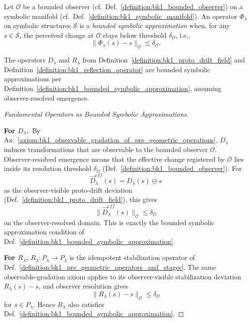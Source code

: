 \begin{definition}
\label{definition:bk1_bounded_symbolic_approximation}
\leavevmode\newline
Let $\mathcal{O}$ be a bounded observer
(cf.~Def.~\ref{definition:bk1_bounded_observer}) on a symbolic manifold
(cf.~Def.~\ref{definition:bk1_symbolic_manifold}).
An operator $\Phi_\lambda$ on symbolic structures $\mathcal{S}$ is a
\emph{bounded symbolic approximation} when, for any $s \in \mathcal{S}$, the
perceived change at $\mathcal{O}$ stays below threshold $\delta_\mathcal{O}$,
i.e.,
\[
\|\Phi_\lambda(s) - s\|_\mathcal{O} \leq \delta_\mathcal{O}.
\]
\end{definition}

\begin{proposition}
\label{proposition:bk1_the_operators_lambda_and_lambda}
The operators $D_\lambda$ and $R_\lambda$ from Definition~\ref{definition:bk1_proto_drift_field} and Definition~\ref{definition:bk1_reflection_operator} are bounded symbolic approximations per Definition~\ref{definition:bk1_bounded_symbolic_approximation}, assuming observer-resolved emergence.
\end{proposition}
\begin{proof}[Fundamental Operators as Bounded Symbolic Approximations]
\label{proof:bk1_sketch_effective_proto_drift_field_induction}
\leavevmode

\textbf{For $D_\lambda$.}\ By Ax.~\ref{axiom:bk1_observable_gradation_of_pre_geometric_operations},
\(D_\lambda\) induces transformations that are observable to the bounded
observer \(\mathcal{O}\). Observer-resolved emergence means that the effective
change registered by \(\mathcal{O}\) lies inside its resolution threshold
\(\delta_{\mathcal{O}}\) (Def.~\ref{definition:bk1_bounded_observer}). For
\[
\vec{D}_\lambda^{eff}(s)=D_\lambda(s)\ominus s
\]
as the observer-visible proto-drift deviation
(Def.~\ref{definition:bk1_proto_drift_field}), this gives
\[
\|\vec{D}_\lambda^{eff}(s)\|_{\mathcal{O}}\leq \delta_{\mathcal{O}}
\]
on the observer-resolved domain. This is exactly the bounded symbolic
approximation condition of Def.~\ref{definition:bk1_bounded_symbolic_approximation}.

\textbf{For $R_\lambda$.}
\(R_\lambda:P_\lambda\to P_\lambda\) is the idempotent stabilization operator
of Def.~\ref{definition:bk1_pre_geometric_operators_and_stages}. The same
observable-gradation axiom applies to its observer-visible stabilization
deviation \(R_\lambda(s)-s\), and observer resolution gives
\[
\|R_\lambda(s)-s\|_{\mathcal{O}}\leq \delta_{\mathcal{O}}
\]
for \(s\in P_\lambda\). Hence \(R_\lambda\) also satisfies
Def.~\ref{definition:bk1_bounded_symbolic_approximation}.
\end{proof}

